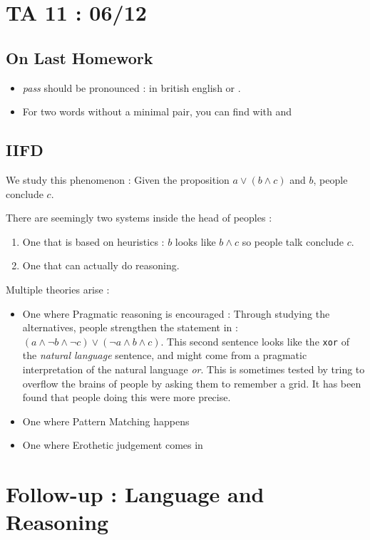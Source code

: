 \documentclass{cours}
\begin{document}
\section{TA 11\! : 06/12}
\subsection{On Last Homework}
\begin{itemize}
    \item \textsl{pass} should be pronounced : \textipa{[p\super{h}A:s]} in british english or \textipa{[p\super{h}\ae s]}.
    \item For two words without a minimal pair, you can find with \textipa{[Z]} and \textipa{[t]}
\end{itemize}
\subsection{IIFD}
We study this phenomenon : Given the proposition $a \lor \left(b \land c\right)$ and $b$, people conclude $c$.


There are seemingly two systems inside the head of peoples : 
\begin{enumerate}
    \item One that is based on heuristics : $b$ looks like $b \land c$ so people talk conclude $c$.
    \item One that can actually do reasoning. 
\end{enumerate}

Multiple theories arise : 
\begin{itemize}
    \item One where Pragmatic reasoning is encouraged : 
    Through studying the alternatives, people strengthen the statement in : $\left(a \land \lnot b \land \lnot c\right) \lor \left(\lnot a\land b \land c\right)$. This second sentence looks like the \texttt{xor} of the \textit{natural language} sentence, and might come from a pragmatic interpretation of the natural language \textsl{or}.  This is sometimes tested by tring to overflow the brains of people by asking them to remember a grid. It has been found that people doing this were more precise. 
    \item One where Pattern Matching happens
    \item One where Erothetic judgement comes in
\end{itemize}


\section[Class 10\!: 14/12]{Follow-up : Language and Reasoning}
\end{document}
